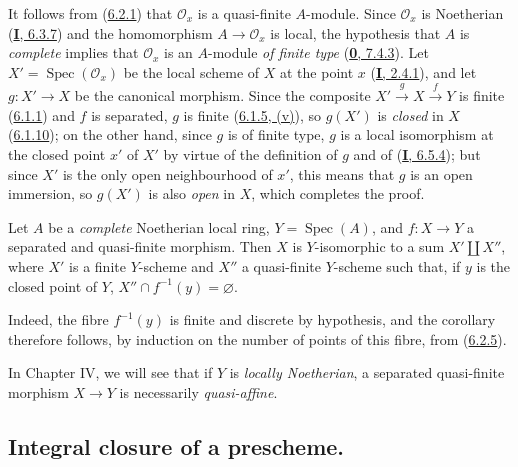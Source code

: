 It follows from (\hyperref[II.6.2.1]{6.2.1}) that $\mathcal{O}_x$ is a
quasi-finite $A$-module. Since $\mathcal{O}_x$ is Noetherian
(\hyperref[I.6.3.7]{\textbf{I}, 6.3.7}) and the homomorphism
$A\to\mathcal{O}_x$ is local, the hypothesis that $A$ is \emph{complete} implies
that $\mathcal{O}_x$ is an $A$-module \emph{of finite type}
(\hyperref[0.7.4.3]{\textbf{0}, 7.4.3}). Let
$X'=\operatorname{Spec}(\mathcal{O}_x)$ be the local scheme of $X$ at the
point $x$ (\hyperref[I.2.4.1]{\textbf{I}, 2.4.1}), and let $g:X'\to X$ be the
canonical morphism. Since the composite $X'\xrightarrow{g}X\xrightarrow{f}Y$
is finite (\hyperref[II.6.1.1]{6.1.1}) and $f$ is separated, $g$ is
finite (\hyperref[II.6.1.5]{6.1.5, (v)}), so $g(X')$ is \emph{closed} in $X$
(\hyperref[II.6.1.10]{6.1.10}); on the other hand, since $g$ is of finite
type, $g$ is a local isomorphism at the closed point $x'$ of $X'$ by virtue
of the definition of $g$ and of (\hyperref[I.6.5.4]{\textbf{I}, 6.5.4}); but since
$X'$ is the only open neighbourhood of $x'$, this means that $g$ is an open
immersion, so $g(X')$ is also \emph{open} in $X$, which completes the proof.

\begin{corollary}[6.2.6]
\label{II.6.2.6}
Let $A$ be a \emph{complete} Noetherian local ring, $Y=\operatorname{Spec}(A)$, and
$f:X\to Y$ a separated and quasi-finite morphism. Then $X$ is $Y$-isomorphic
to a sum $X'\amalg X''$, where $X'$ is a finite $Y$-scheme and $X''$ a
quasi-finite $Y$-scheme such that, if $y$ is the closed point of $Y$,
$X''\cap f^{-1}(y)=\varnothing$.
\end{corollary}

Indeed, the fibre $f^{-1}(y)$ is finite and discrete by hypothesis, and the
corollary therefore follows, by induction on the number of points of this
fibre, from (\hyperref[II.6.2.5]{6.2.5}).

\begin{remark}[6.2.7]
\label{II.6.2.7}
In Chapter IV, we will see that if $Y$ is \emph{locally Noetherian}, a separated
quasi-finite morphism $X\to Y$ is necessarily \emph{quasi-affine}.
\end{remark}

\subsection{Integral closure of a prescheme.}
\label{subsection:II.6.3}

